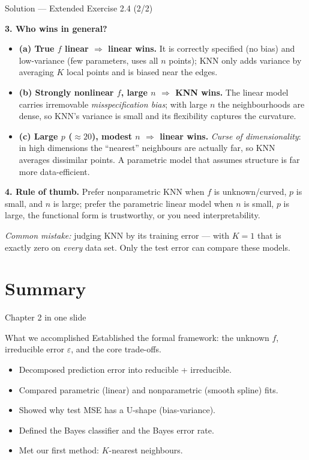 \documentclass[aspectratio=169,11pt]{beamer}
\begin{document}
\begin{frame}{Solution --- Extended Exercise 2.4 (2/2)}
\begin{solutionbox}
\textbf{3. Who wins in general?}
\begin{itemize}\setlength\itemsep{1pt}
  \item \textbf{(a) True $f$ linear $\Rightarrow$ linear wins.} It is correctly specified (no bias) and low-variance (few parameters, uses all $n$ points); KNN only adds variance by averaging $K$ local points and is biased near the edges.
  \item \textbf{(b) Strongly nonlinear $f$, large $n$ $\Rightarrow$ KNN wins.} The linear model carries irremovable \emph{misspecification bias}; with large $n$ the neighbourhoods are dense, so KNN's variance is small and its flexibility captures the curvature.
  \item \textbf{(c) Large $p$ ($\approx20$), modest $n$ $\Rightarrow$ linear wins.} \emph{Curse of dimensionality}: in high dimensions the ``nearest'' neighbours are actually far, so KNN averages dissimilar points. A parametric model that assumes structure is far more data-efficient.
\end{itemize}
\textbf{4. Rule of thumb.} Prefer nonparametric KNN when $f$ is unknown/curved, $p$ is small, and $n$ is large; prefer the parametric linear model when $n$ is small, $p$ is large, the functional form is trustworthy, or you need interpretability.

\smallskip
\textit{Common mistake:} judging KNN by its training error --- with $K=1$ that is exactly zero on \emph{every} data set. Only the test error can compare these models.
\end{solutionbox}
\end{frame}


\section{Summary}

\begin{frame}{Chapter 2 in one slide}
  \begin{block}{What we accomplished}
    Established the formal framework: the unknown $f$, irreducible
    error $\varepsilon$, and the core trade-offs.
  \end{block}
  \begin{itemize}
    \item Decomposed prediction error into reducible + irreducible.
    \item Compared parametric (linear) and nonparametric (smooth
          spline) fits.
    \item Showed why test MSE has a U-shape (bias-variance).
    \item Defined the Bayes classifier and the Bayes error rate.
    \item Met our first method: $K$-nearest neighbours.
  \end{itemize}
\end{frame}
\end{document}
